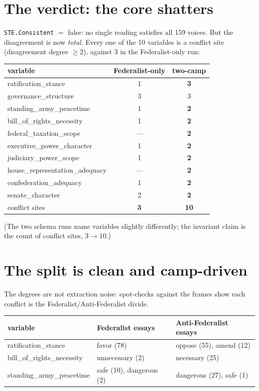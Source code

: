 \documentclass[11pt]{article}
\newcommand{\lean}[1]{\texttt{#1}}
\newcommand{\vv}[1]{\textsf{\small #1}}
\begin{document}
\section{The verdict: the core shatters}

\lean{STE.Consistent} $=$ \textsf{false}: no single reading satisfies all
159 voices. But the disagreement is now \emph{total}. Every one of the 10
variables is a conflict site (disagreement degree $\ge 2$), against 3 in the
Federalist-only run:

\begin{center}\small
\begin{tabular}{@{}l c c@{}}
\toprule
variable & Federalist-only & two-camp \\
\midrule
ratification\_stance          & 1 & \textbf{3} \\
governance\_structure         & 3 & 3 \\
standing\_army\_peacetime     & 1 & \textbf{2} \\
bill\_of\_rights\_necessity   & 1 & \textbf{2} \\
federal\_taxation\_scope      & --- & \textbf{2} \\
executive\_power\_character   & 1 & \textbf{2} \\
judiciary\_power\_scope       & 1 & \textbf{2} \\
house\_representation\_adequacy & --- & \textbf{2} \\
confederation\_adequacy       & 1 & \textbf{2} \\
senate\_character             & 2 & \textbf{2} \\
\midrule
conflict sites                & \textbf{3} & \textbf{10} \\
\bottomrule
\end{tabular}
\end{center}

\noindent (The two schema runs name variables slightly differently; the
invariant claim is the count of conflict sites, $3 \to 10$.)

\section{The split is clean and camp-driven}

The degrees are not extraction noise: spot-checks against the frames show
each conflict is the Federalist/Anti-Federalist divide.

\begin{center}\small
\begin{tabular}{@{}l l l@{}}
\toprule
variable & Federalist essays & Anti-Federalist essays \\
\midrule
ratification\_stance & \vv{favor} (78) & \vv{oppose} (55), \vv{amend} (12) \\
bill\_of\_rights\_necessity & \vv{unnecessary} (2) & \vv{necessary} (25) \\
standing\_army\_peacetime & \vv{safe} (10), \vv{dangerous} (2) & \vv{dangerous} (27), \vv{safe} (1) \\
\bottomrule
\end{tabular}
\end{center}
\end{document}
